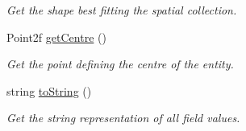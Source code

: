 \begin{DoxyCompactItemize}
\begin{DoxyCompactList}\small\item\em Get the shape best fitting the spatial collection. \end{DoxyCompactList}\item 
Point2f \hyperlink{classmultiscale_1_1analysis_1_1SpatialCollection2D_ac8b879dca765e47b9e0ef86d440e28e6}{get\-Centre} ()
\begin{DoxyCompactList}\small\item\em Get the point defining the centre of the entity. \end{DoxyCompactList}\item 
string \hyperlink{classmultiscale_1_1analysis_1_1SpatialCollection2D_a6ff771bb6022d9c991348f29227d10d9}{to\-String} ()
\begin{DoxyCompactList}\small\item\em Get the string representation of all field values. \end{DoxyCompactList}\end{DoxyCompactItemize}
